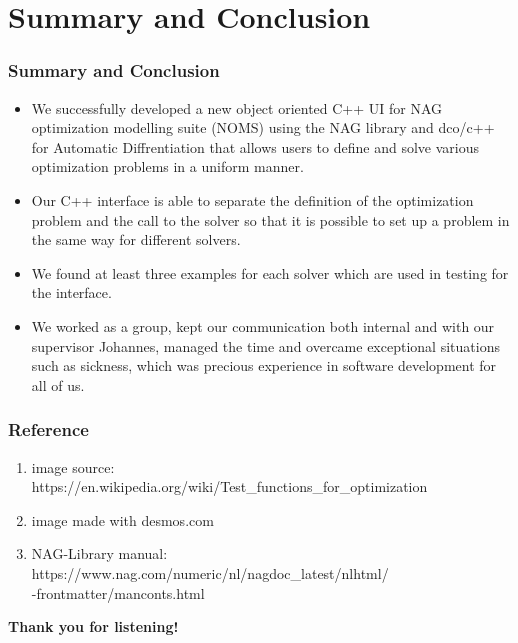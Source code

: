 \documentclass[ucs,10pt]{beamer}
\begin{document}
\section{Summary and Conclusion}
\begin{frame}
\frametitle{Summary and Conclusion}
\begin{itemize}
	\item We successfully developed a new object oriented C++ UI for NAG optimization modelling suite (NOMS) using the NAG library and dco/c++ for Automatic Diffrentiation that allows users to define and solve various optimization problems in a uniform manner. 
	\item Our C++ interface is able to separate the definition of the optimization problem and the call to the solver so that it is possible to set up a problem in the same way for different solvers. 
	\item We found at least three examples for each solver which are used in testing for the interface.
	\item We worked as a group, kept our communication both internal and with our supervisor Johannes, managed the time and overcame exceptional situations such as sickness, which was precious experience in software development for all of us. 
\end{itemize}
\end{frame}

\begin{frame}
\frametitle{Reference}
\begin{enumerate}
	\item image source: https://en.wikipedia.org/wiki/Test\_functions\_for\_optimization  
	\item image made with desmos.com 
	\item NAG-Library manual: https://www.nag.com/numeric/nl/nagdoc\_latest/nlhtml/\\ -frontmatter/manconts.html
\end{enumerate}
\end{frame}

\begin{frame}
\LARGE\textbf{Thank you for listening!}
\end{frame}
\end{document}
